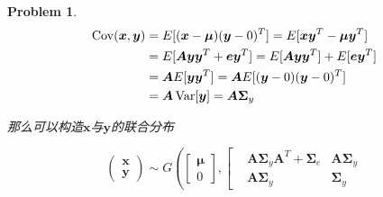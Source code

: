 \documentclass[UTF8]{article}
\newtheorem{hw}{Problem}
\newenvironment{sol}
\DeclareMathOperator{\var}{Var}
\DeclareMathOperator{\cov}{Cov}
\newcommand{\Amat}{{\boldsymbol A}}
\newcommand{\ev}[0]{{\boldsymbol{e}}}
\newcommand{\xv}{\boldsymbol{x}}
\newcommand{\yv}{\boldsymbol{y}}
\newcommand{\Sigmamat}{\boldsymbol{\Sigma}}
\newcommand{\muv}{\boldsymbol{\mu}}
\begin{document}
\begin{hw}
\begin{sol}
		\begin{equation}

			\label{eq:FA_cov}

			\begin{aligned}

				\cov(\xv,\yv)&=E[(\xv-\muv)(\yv-0)^T]=E[\xv\yv^T-\muv\yv^T] \\

							 &=E[\Amat\yv\yv^T+\ev\yv^T]=E[\Amat\yv\yv^T]+E[\ev\yv^T] \\

							 &=\Amat E[\yv\yv^T] = \Amat E[(\yv-0)(\yv-0)^T] \\

							 &=\Amat \var[\yv] = \Amat\Sigmamat_y

			\end{aligned}

		\end{equation}

		

		那么可以构造$\xv$与$\yv$的联合分布

		\begin{equation}

			\label{eq:FA_build}

			\left(

				\begin{aligned}

					\xv \\ 

					\yv

				\end{aligned}

			\right)\sim G

			\left(

				\left[	

					\begin{aligned}

						\muv \\

						0

					\end{aligned}

				\right],

				\left[

					\begin{aligned}

						 &\Amat\Sigmamat_y\Amat^T+\Sigmamat_e & \Amat\Sigmamat_y \\

						 &\Amat\Sigmamat_y & \Sigmamat_y


\end{aligned}
\end{equation}
\end{sol}
\end{hw}
\end{document}
